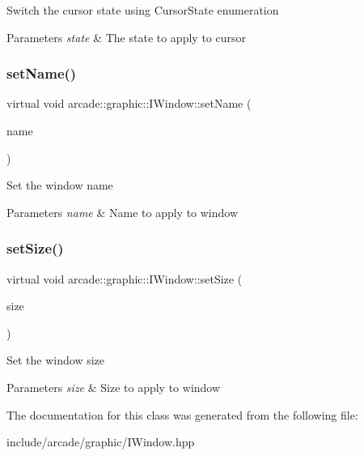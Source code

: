 Switch the cursor state using Cursor\+State enumeration 
\begin{DoxyParams}{Parameters}
{\em state} & The state to apply to cursor \\
\hline
\end{DoxyParams}
\mbox{\label{classarcade_1_1graphic_1_1_i_window_ad9f161f552c15d131661103567b9c9c3}} 
\subsubsection{\texorpdfstring{setName()}{setName()}}
{\footnotesize\ttfamily virtual void arcade\+::graphic\+::\+I\+Window\+::set\+Name (\begin{DoxyParamCaption}\item[{const std\+::string \&}]{name }\end{DoxyParamCaption})\hspace{0.3cm}{\ttfamily [pure virtual]}}

Set the window name 
\begin{DoxyParams}{Parameters}
{\em name} & Name to apply to window \\
\hline
\end{DoxyParams}
\mbox{\label{classarcade_1_1graphic_1_1_i_window_a4c6258e5dfaf0eb23304ba290d51f750}} 
\subsubsection{\texorpdfstring{setSize()}{setSize()}}
{\footnotesize\ttfamily virtual void arcade\+::graphic\+::\+I\+Window\+::set\+Size (\begin{DoxyParamCaption}\item[{const \mbox{\hyperlink{classarcade_1_1graphic_1_1_i_vector2i}{I\+Vector2i}} \&}]{size }\end{DoxyParamCaption})\hspace{0.3cm}{\ttfamily [pure virtual]}}

Set the window size 
\begin{DoxyParams}{Parameters}
{\em size} & Size to apply to window \\
\hline
\end{DoxyParams}


The documentation for this class was generated from the following file\+:\begin{DoxyCompactItemize}
\item 
include/arcade/graphic/I\+Window.\+hpp\end{DoxyCompactItemize}
